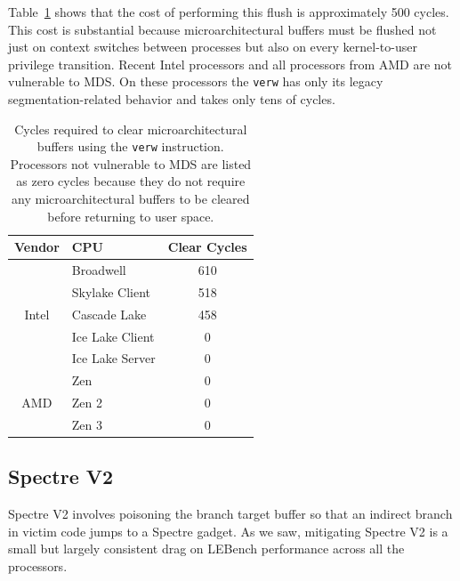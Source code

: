 Table~\ref{table:verw} shows that the cost of performing this flush is approximately 500 cycles.
This cost is substantial because microarchitectural buffers must be flushed not
just on context switches between processes but also on every kernel-to-user privilege transition.
Recent Intel processors and all processors from AMD are not vulnerable to MDS.
On these processors the \texttt{verw} has only its legacy segmentation-related behavior and takes only tens of cycles.

\begin{table}[h]
  \begin{center}
  \begin{tabular}{clc}
      \textbf{Vendor} & \textbf{CPU} & \textbf{Clear Cycles} \\ \hline 
      \multirow{5}{*}{Intel} & Broadwell             & 610 \\
                             & Skylake Client        & 518 \\
                             & Cascade Lake          & 458 \\
                             & Ice Lake Client       & 0 \\
                             & Ice Lake Server       & 0 \\ \hline
      \multirow{3}{*}{AMD}   & Zen                   & 0 \\
                             & Zen 2                 & 0 \\
                             & Zen 3                 & 0 \\ \hline
  \end{tabular}
  \end{center}
  \caption{Cycles required to clear microarchitectural buffers using the
    \texttt{verw} instruction. Processors not vulnerable to MDS are listed as
    zero cycles because they do not require any microarchitectural buffers to be cleared before returning to user space. }
  \label{table:verw}
\end{table}

\subsection{Spectre V2}

Spectre V2 involves poisoning the branch target buffer so that an indirect branch in victim code jumps to a Spectre gadget.
As we saw, mitigating Spectre V2 is a small but largely consistent drag on LEBench performance across all the processors.

